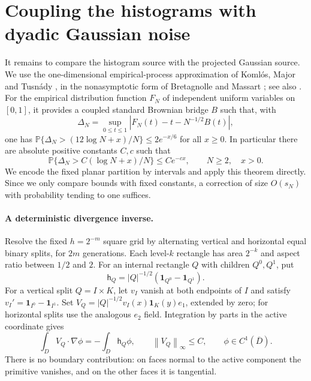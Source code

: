 \documentclass[11pt]{article}
\theoremstyle{definition}
\theoremstyle{remark}
\numberwithin{equation}{section}
\newcommand{\Pp}{\mathbb P}
\newcommand{\one}{\mathbf 1}
\newcommand{\norm}[1]{\left\|#1\right\|}
\begin{document}
\section{Coupling the histograms with dyadic Gaussian noise}

It remains to compare the histogram source with the projected Gaussian
source. We use the one-dimensional empirical-process approximation of
Koml\'os, Major and Tusn\'ady \cite{KMT1975}, in the nonasymptotic
form of Bretagnolle and Massart \cite[Theorem~1]{BretagnolleMassart1989};
see also \cite[Theorem~1.8 and equation~(1.1)]{DudleyUCLT}.
For the empirical distribution function $F_N$ of independent uniform
variables on $[0,1]$, it provides a coupled standard Brownian bridge
$B$ such that, with
\[
 \Delta_N=\sup_{0\le t\le1}|F_N(t)-t-N^{-1/2}B(t)|,
\]
one has $\Pp\{\Delta_N>(12\log N+x)/N\}\le2e^{-x/6}$ for all $x\ge0$.
In particular there are absolute positive constants $C,c$ such that
\begin{equation}\label{red:eq:KMT-cdf}
 \Pp\{\Delta_N>C(\log N+x)/N\}\le Ce^{-cx},
 \qquad N\ge2,\quad x>0.
\end{equation}
We encode the fixed planar partition by intervals and apply this
theorem directly. Since we only compare bounds with fixed constants, a
correction of size $O(s_N)$ with probability tending to one suffices.

\paragraph{A deterministic divergence inverse.}
Resolve the fixed $h=2^{-m}$ square grid by alternating vertical
and horizontal equal binary splits, for $2m$ generations. Each
level-$k$ rectangle has area $2^{-k}$ and aspect ratio between
$1/2$ and $2$. For an internal rectangle $Q$ with children
$Q^0,Q^1$, put
\[
 \mathsf h_Q=|Q|^{-1/2}(\one_{Q^0}-\one_{Q^1}).
\]
For a vertical split $Q=I\times K$, let $v_I$ vanish at both
endpoints of $I$ and satisfy $v_I'=\one_{I^0}-\one_{I^1}$.
Set $V_Q=|Q|^{-1/2}v_I(x)\one_K(y)e_1$, extended by zero;
for horizontal splits use the analogous $e_2$ field. Integration
by parts in the active coordinate gives
\begin{equation}\label{red:eq:corrector}
 \int_D V_Q\cdot\nabla\phi=-\int_D\mathsf h_Q\phi,
 \qquad \norm{V_Q}_\infty\le C,
 \qquad \phi\in C^1(\overline D).
\end{equation}
There is no boundary contribution: on faces normal to the active
component the primitive vanishes, and on the other faces it is tangential.
\end{document}
